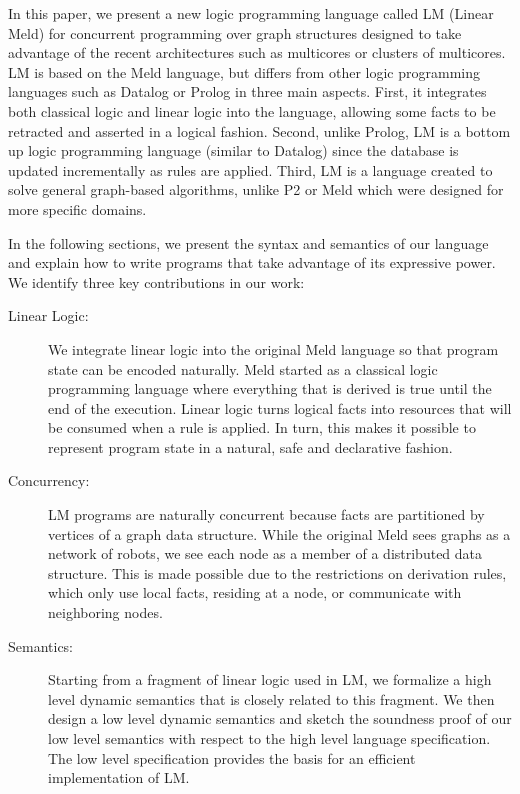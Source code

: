 In this paper, we present a new logic programming language called LM (Linear Meld) for concurrent programming over graph structures designed to take advantage
of the recent architectures such as multicores or clusters of multicores. LM is based on the Meld language, but differs from other logic programming languages
such as Datalog or Prolog in three main aspects. First, it integrates both classical
logic and linear logic into the language, allowing some facts to be retracted and asserted in a logical fashion. Second, unlike
Prolog, LM is a bottom up logic programming language (similar to Datalog) since the database is updated incrementally as rules are
applied. Third, LM is a language created to solve general graph-based algorithms, unlike P2 or Meld which were designed for more specific domains.

In the following sections, we present the syntax and semantics of our language and explain how to write programs that take advantage of its expressive power. We identify three key contributions in our work:

\begin{description}
   \item[Linear Logic:] We integrate linear logic into the original Meld language so that program state can be encoded naturally.
   Meld started as a classical logic programming language where everything that is derived is true until the end
   of the execution. Linear logic turns logical facts into resources that will be consumed when a rule is applied. In turn, this makes it possible to represent program state in a natural, safe and declarative fashion.
   \item[Concurrency:] LM programs are naturally concurrent because facts are partitioned by vertices of a graph data structure. While the original Meld sees graphs as a network of robots, we see each node as a member of a distributed data structure. This is made possible due to the restrictions on derivation rules, which
only use local facts, residing at a node, or communicate with neighboring nodes.
   \item[Semantics:] Starting from a fragment of linear logic used in LM, we formalize a high level dynamic semantics that is closely related to this fragment.
   We then design a low level dynamic semantics and sketch the soundness proof of our low level
   semantics with respect to the high level language specification. The low level specification
   provides the basis for an efficient implementation of LM.
\end{description}

